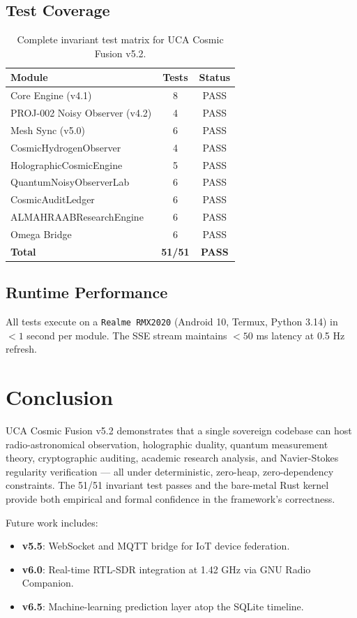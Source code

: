 \documentclass[12pt,a4paper]{article}
\theoremstyle{definition}
\begin{document}
\subsection{Test Coverage}
\begin{table}[h]
\centering
\begin{tabular}{lcc}
\toprule
\textbf{Module} & \textbf{Tests} & \textbf{Status} \\
\midrule
Core Engine (v4.1) & 8 & PASS \\
PROJ-002 Noisy Observer (v4.2) & 4 & PASS \\
Mesh Sync (v5.0) & 6 & PASS \\
CosmicHydrogenObserver & 4 & PASS \\
HolographicCosmicEngine & 5 & PASS \\
QuantumNoisyObserverLab & 6 & PASS \\
CosmicAuditLedger & 6 & PASS \\
ALMAHRAABResearchEngine & 6 & PASS \\
Omega Bridge & 6 & PASS \\
\midrule
\textbf{Total} & \textbf{51/51} & \textbf{PASS} \\
\bottomrule
\end{tabular}
\caption{Complete invariant test matrix for UCA Cosmic Fusion v5.2.}
\end{table}

\subsection{Runtime Performance}
All tests execute on a \texttt{Realme RMX2020} (Android 10, Termux, Python 3.14) in $< 1$ second per module. The SSE stream maintains $< 50$ ms latency at 0.5 Hz refresh.

\section{Conclusion}

UCA Cosmic Fusion v5.2 demonstrates that a single sovereign codebase can host radio-astronomical observation, holographic duality, quantum measurement theory, cryptographic auditing, academic research analysis, and Navier-Stokes regularity verification — all under deterministic, zero-heap, zero-dependency constraints. The 51/51 invariant test passes and the bare-metal Rust kernel provide both empirical and formal confidence in the framework's correctness.

Future work includes:
\begin{itemize}
    \item \textbf{v5.5}: WebSocket and MQTT bridge for IoT device federation.
    \item \textbf{v6.0}: Real-time RTL-SDR integration at 1.42 GHz via GNU Radio Companion.
    \item \textbf{v6.5}: Machine-learning prediction layer atop the SQLite timeline.
\end{itemize}
\end{document}
